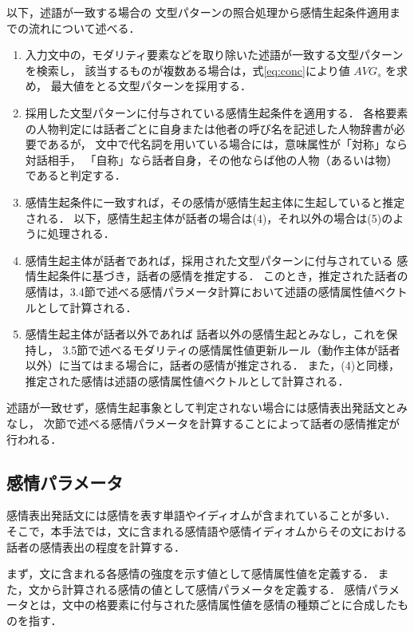 \documentclass[japanese]{jnlp_1.3c}
\begin{document}
以下，述語が一致する場合の
文型パターンの照合処理から感情生起条件適用までの流れについて述べる．


\begin{enumerate}
\item 入力文中の，モダリティ要素などを取り除いた述語が一致する文型パターンを検索し，
該当するものが複数ある場合は，式\ref{eq:conc}により値 $AVG_s$ を求め，
最大値をとる文型パターンを採用する．
\item 採用した文型パターンに付与されている感情生起条件を適用する．
各格要素の人物判定には話者ごとに自身または他者の呼び名を記述した人物辞書が必要であるが，
文中で代名詞を用いている場合には，意味属性が「対称」なら対話相手，
「自称」なら話者自身，その他ならば他の人物（あるいは物）であると判定する．
\item 感情生起条件に一致すれば，その感情が感情生起主体に生起していると推定される．
以下，感情生起主体が話者の場合は(4)，それ以外の場合は(5)のように処理される．
\item 感情生起主体が話者であれば，採用された文型パターンに付与されている
感情生起条件に基づき，話者の感情を推定する．
このとき，推定された話者の感情は，3.4節で述べる感情パラメータ計算において述語の感情属性値ベクトルとして計算される．
\item 感情生起主体が話者以外であれば
話者以外の感情生起とみなし，これを保持し，
3.5節で述べるモダリティの感情属性値更新ルール（動作主体が話者以外）に当てはまる場合に，話者の感情が推定される．
また，(4)と同様，推定された感情は述語の感情属性値ベクトルとして計算される．

\end{enumerate}

述語が一致せず，感情生起事象として判定されない場合には感情表出発話文とみなし，
次節で述べる感情パラメータを計算することによって話者の感情推定が行われる．\\

\subsection{感情パラメータ}

感情表出発話文には感情を表す単語やイディオムが含まれていることが多い．
そこで，本手法では，文に含まれる感情語や感情イディオムからその文における話者の感情表出の程度を計算する．

まず，文に含まれる各感情の強度を示す値として感情属性値を定義する．
また，文から計算される感情の値として感情パラメータを定義する．
感情パラメータとは，文中の格要素に付与された感情属性値を感情の種類ごとに合成したものを指す．
\end{document}
